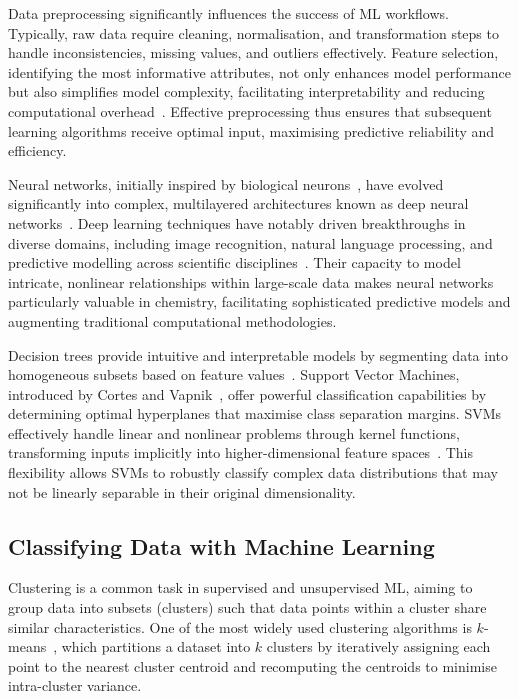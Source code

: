 Data preprocessing significantly influences the success of \gls{ML} workflows.
Typically, raw data require cleaning, normalisation, and transformation steps
to handle inconsistencies, missing values, and outliers effectively. Feature
selection, identifying the most informative attributes, not only enhances model
performance but also simplifies model complexity, facilitating interpretability
and reducing computational overhead~\cite{Guyon2003}. Effective preprocessing
thus ensures that subsequent learning algorithms receive optimal input,
maximising predictive reliability and efficiency.

\vspace{1em}%
Neural networks, initially inspired by biological neurons~\cite{McCulloch1943},
have evolved significantly into complex, multilayered architectures known as
deep neural networks~\cite{LeCun2015}. Deep learning techniques have notably
driven breakthroughs in diverse domains, including image recognition, natural
language processing, and predictive modelling across scientific
disciplines~\cite{Krizhevsky2017,He2016}. Their capacity to model intricate,
nonlinear relationships within large-scale data makes neural networks
particularly valuable in chemistry, facilitating sophisticated predictive
models and augmenting traditional computational methodologies.

\vspace{1em}%
Decision trees provide intuitive and interpretable models by segmenting data
into homogeneous subsets based on feature values~\cite{Quinlan1986}. Support
Vector Machines, introduced by Cortes and Vapnik~\cite{Cortes1995}, offer
powerful classification capabilities by determining optimal hyperplanes that
maximise class separation margins. \glspl{SVM} effectively handle linear and
nonlinear problems through kernel functions, transforming inputs implicitly
into higher-dimensional feature spaces~\cite{Scholkopf2002}. This flexibility
allows \glspl{SVM} to robustly classify complex data distributions that may not
be linearly separable in their original dimensionality.

\newpage

\subsection{Classifying Data with Machine Learning}

Clustering is a common task in supervised and unsupervised \gls{ML}, aiming to
group data into subsets (clusters) such that data points within a cluster share
similar characteristics. One of the most widely used clustering algorithms is
$k$-means~\cite{Lloyd1982}, which partitions a dataset into $k$ clusters by
iteratively assigning each point to the nearest cluster centroid and
recomputing the centroids to minimise intra-cluster variance.

